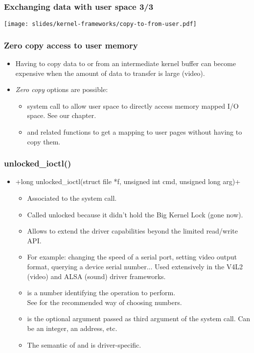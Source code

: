 \begin{frame}
 \frametitle{Exchanging data with user space 3/3}
 \begin{center}
    \texttt{[image: slides/kernel-frameworks/copy-to-from-user.pdf]}
 \end{center}
\end{frame}

\begin{frame}
  \frametitle{Zero copy access to user memory}
  \begin{itemize}
  \item Having to copy data to or from an intermediate kernel buffer
    can become expensive when the amount of data to transfer is
    large (video).
  \item \emph{Zero copy} options are possible:
    \begin{itemize}
    \item {} system call to allow user space to directly
      access memory mapped I/O space. See our  chapter.
    \item {} and related functions to get a
      mapping to user pages without having to copy them.
    \end{itemize}
  \end{itemize}
\end{frame}

\begin{frame}[fragile]
  \frametitle{unlocked\_ioctl()}
  \begin{itemize}
  \item {}+long unlocked_ioctl(struct file *f, unsigned int cmd, unsigned long arg)+
    \begin{itemize}
    \item Associated to the  system call.
    \item Called unlocked because it didn't hold the Big Kernel Lock
      (gone now).
    \item Allows to extend the driver capabilities beyond the limited
      read/write API.
    \item For example: changing the speed of a serial port, setting
      video output format, querying a device serial number... Used
      extensively in the V4L2 (video) and ALSA (sound) driver frameworks.
    \item {} is a number identifying the operation to perform.\\
      See  for the recommended way of choosing
       numbers.
    \item {} is the optional argument passed as third argument
      of the  system call. Can be an integer, an
      address, etc.
    \item The semantic of  and  is
      driver-specific.
    \end{itemize}
  \end{itemize}
\end{frame}

